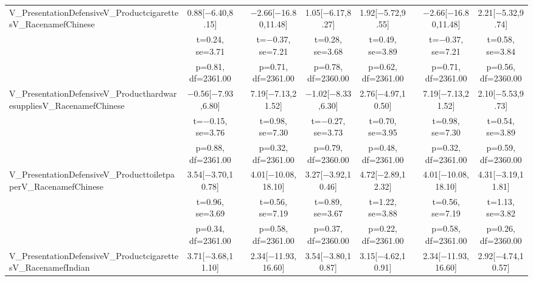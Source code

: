 \documentclass[]{report}
\begin{document}
\begin{table}
{\begin{tabular}[t]{lcccccccc}
		V\_PresentationDefensiveV\_ProductcigarettesV\_RacenamefChinese & \num{0.88}[\num{-6.40},\num{8.15}] &  & \num{-2.66}[\num{-16.80},\num{11.48}] & \num{1.05}[\num{-6.17},\num{8.27}] & \num{1.92}[\num{-5.72},\num{9.55}] &  & \num{-2.66}[\num{-16.80},\num{11.48}] & \num{2.21}[\num{-5.32},\num{9.74}]\\
		& t=\num{0.24}, se=\num{3.71} &  & t=\num{-0.37}, se=\num{7.21} & t=\num{0.28}, se=\num{3.68} & t=\num{0.49}, se=\num{3.89} &  & t=\num{-0.37}, se=\num{7.21} & t=\num{0.58}, se=\num{3.84}\\
		& p=\num{0.81}, df=\num{2361.00} &  & p=\num{0.71}, df=\num{2361.00} & p=\num{0.78}, df=\num{2360.00} & p=\num{0.62}, df=\num{2361.00} &  & p=\num{0.71}, df=\num{2361.00} & p=\num{0.56}, df=\num{2360.00}\\
		V\_PresentationDefensiveV\_ProducthardwaresuppliesV\_RacenamefChinese & \num{-0.56}[\num{-7.93},\num{6.80}] &  & \num{7.19}[\num{-7.13},\num{21.52}] & \num{-1.02}[\num{-8.33},\num{6.30}] & \num{2.76}[\num{-4.97},\num{10.50}] &  & \num{7.19}[\num{-7.13},\num{21.52}] & \num{2.10}[\num{-5.53},\num{9.73}]\\
		& t=\num{-0.15}, se=\num{3.76} &  & t=\num{0.98}, se=\num{7.30} & t=\num{-0.27}, se=\num{3.73} & t=\num{0.70}, se=\num{3.95} &  & t=\num{0.98}, se=\num{7.30} & t=\num{0.54}, se=\num{3.89}\\
		& p=\num{0.88}, df=\num{2361.00} &  & p=\num{0.32}, df=\num{2361.00} & p=\num{0.79}, df=\num{2360.00} & p=\num{0.48}, df=\num{2361.00} &  & p=\num{0.32}, df=\num{2361.00} & p=\num{0.59}, df=\num{2360.00}\\
		V\_PresentationDefensiveV\_ProducttoiletpaperV\_RacenamefChinese & \num{3.54}[\num{-3.70},\num{10.78}] &  & \num{4.01}[\num{-10.08},\num{18.10}] & \num{3.27}[\num{-3.92},\num{10.46}] & \num{4.72}[\num{-2.89},\num{12.32}] &  & \num{4.01}[\num{-10.08},\num{18.10}] & \num{4.31}[\num{-3.19},\num{11.81}]\\
		& t=\num{0.96}, se=\num{3.69} &  & t=\num{0.56}, se=\num{7.19} & t=\num{0.89}, se=\num{3.67} & t=\num{1.22}, se=\num{3.88} &  & t=\num{0.56}, se=\num{7.19} & t=\num{1.13}, se=\num{3.82}\\
		& p=\num{0.34}, df=\num{2361.00} &  & p=\num{0.58}, df=\num{2361.00} & p=\num{0.37}, df=\num{2360.00} & p=\num{0.22}, df=\num{2361.00} &  & p=\num{0.58}, df=\num{2361.00} & p=\num{0.26}, df=\num{2360.00}\\
		V\_PresentationDefensiveV\_ProductcigarettesV\_RacenamefIndian & \num{3.71}[\num{-3.68},\num{11.10}] &  & \num{2.34}[\num{-11.93},\num{16.60}] & \num{3.54}[\num{-3.80},\num{10.87}] & \num{3.15}[\num{-4.62},\num{10.91}] &  & \num{2.34}[\num{-11.93},\num{16.60}] & \num{2.92}[\num{-4.74},\num{10.57}]\\

\end{tabular}}
\end{table}
\end{document}
